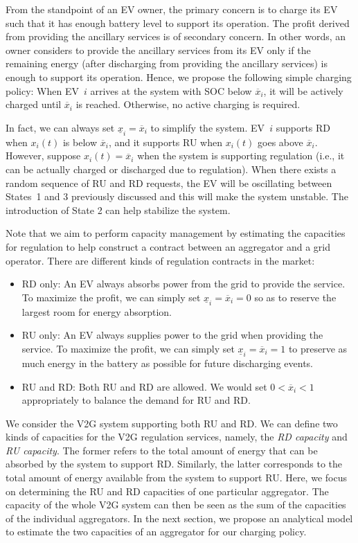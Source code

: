 \documentclass[journal]{IEEEtran}
\begin{document}
From the standpoint of an EV owner, the primary concern is to charge its EV
such that it has enough battery level to support its operation.  The profit
derived from providing the ancillary services is of secondary concern.  In
other words, an owner considers to provide the ancillary services from its EV
only if the remaining energy (after discharging from providing the ancillary
services) is enough to support its operation.  Hence, we propose the following
simple charging policy: When EV~$i$ arrives at the system with SOC below
$\overline{x}_i$, it will be actively charged until $\overline{x}_i$ is
reached.  Otherwise, no active charging is required.

In fact, we can always set $\underline{x}_i = \overline{x}_i$ to simplify the
system.  EV~$i$ supports RD when $x_i(t)$ is below
$\overline{x}_i$, and it supports RU when $x_i(t)$ goes above
$\overline{x}_i$.  However, suppose $x_i(t) = \overline{x}_i$
when the system is supporting regulation (i.e., it can be actually charged or discharged due to
regulation).  When there exists a random sequence of RU and
RD requests,
the EV will be oscillating between States~1 and 3 previously discussed and
this will make the system unstable.  The introduction of State 2 can help stabilize
the system.

Note that we aim to perform capacity management by estimating the capacities
for regulation to help construct a contract between an aggregator and a grid
operator.  There are different kinds of regulation contracts in the market: 
\begin{itemize}
\item RD only: An EV always absorbs power from the grid to provide the service.  To maximize
the profit, we can simply set $\underline{x}_i = \overline{x}_i = 0$ so as to
reserve the largest room for energy absorption.

\item RU only: An EV always supplies power to the grid when providing the service.  To
maximize the profit, we can simply set $\underline{x}_i = \overline{x}_i = 1$
to preserve as much energy in the battery as possible for future discharging
events.

\item RU and RD: Both RU and RD are allowed.  We would set
$0 < \overline{x}_i <1$ appropriately to balance the demand for RU
and RD. 
\end{itemize}


We consider the V2G system supporting both RU and
RD.  We can define two kinds of capacities for the V2G regulation
services, namely, the \textit{RD capacity} and
\textit{RU capacity}.  The former refers to the total amount of
energy that can be absorbed by the system to support RD.
Similarly, the latter corresponds to the total amount of energy available from
the system to support RU.  Here, we focus on determining the
RU and RD capacities of one particular aggregator.  The
capacity of the whole V2G system can then be seen as the sum of the capacities
of the individual aggregators.  In the next section, we propose an analytical
model to estimate the two capacities of an aggregator for our charging policy.
\end{document}
